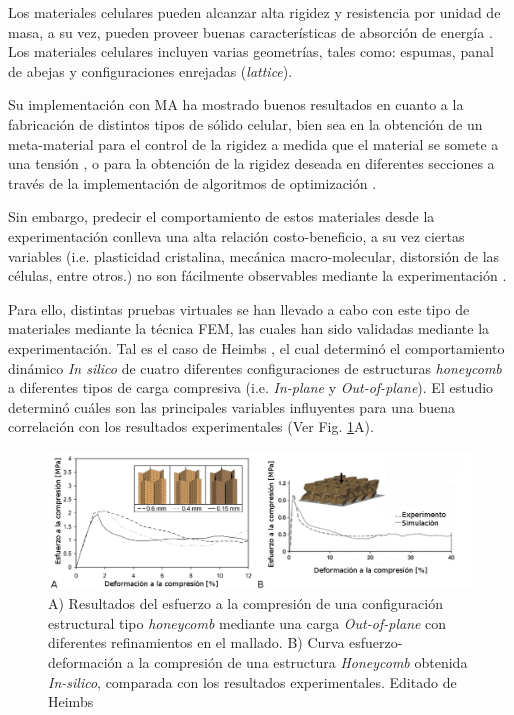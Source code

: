 \documentclass[12pt,english]{article}
\begin{document}
Los materiales celulares pueden alcanzar alta rigidez y resistencia
por unidad de masa, a su vez, pueden proveer buenas características
de absorción de energía \cite{Gibson1997}. Los materiales celulares
incluyen varias geometrías, tales como: espumas, panal de abejas y
configuraciones enrejadas (\emph{lattice}).

Su implementación con MA ha mostrado buenos resultados en cuanto a
la fabricación de distintos tipos de sólido celular, bien sea en la
obtención de un meta-material para el control de la rigidez a medida
que el material se somete a una tensión \cite{Wang2016}, o para la
obtención de la rigidez deseada en diferentes secciones a través de
la implementación de algoritmos de optimización \cite{Chu2010}.

Sin embargo, predecir el comportamiento de estos materiales desde la experimentación conlleva una alta relación costo-beneficio, a su vez ciertas variables (i.e. plasticidad cristalina, mecánica macro-molecular, distorsión de las células, entre otros.) no son fácilmente observables mediante la experimentación \cite{Okereke2014}.

Para ello, distintas pruebas virtuales se han llevado a cabo con este tipo de materiales mediante la técnica FEM, las cuales han sido validadas mediante la experimentación. Tal es el caso de Heimbs \cite{Heimbs2009}, el cual determinó el comportamiento dinámico \emph{In silico} de cuatro diferentes configuraciones de estructuras \emph{honeycomb} a diferentes tipos de carga compresiva (i.e. \emph{In-plane} y \emph{Out-of-plane}). El estudio determinó cuáles son las principales variables influyentes para una buena correlación con los resultados experimentales (Ver Fig. \ref{fig:CellularFEM}A).

\begin{figure}
\begin{centering}

\includegraphics[scale=0.45]{stress-strainFEM2}
\par\end{centering}

\caption{\label{fig:CellularFEM} A) Resultados del esfuerzo a la compresión de una configuración estructural tipo \emph{honeycomb} mediante una carga \emph{Out-of-plane} con diferentes refinamientos en el mallado. B) Curva esfuerzo-deformación a la compresión de una estructura \emph{Honeycomb} obtenida \emph{In-silico}, comparada con los resultados experimentales. Editado de Heimbs \cite{Heimbs2009}}
\end{figure}
\end{document}
